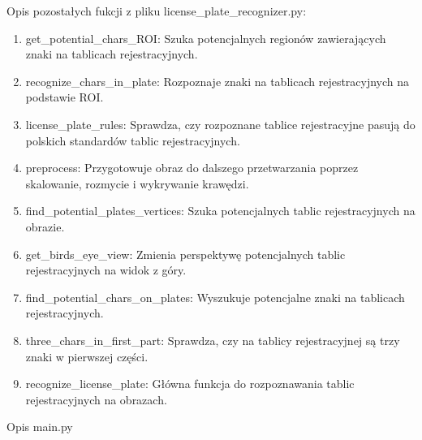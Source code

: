 \documentclass[12pt,a4paper,oneside]{article}
\theoremstyle{definition}
\numberwithin{equation}{section}
\begin{document}
Opis pozostałych fukcji z pliku license{\_}plate{\_}recognizer.py:
\begin{enumerate}
  \item get{\_}potential{\_}chars{\_}ROI: Szuka potencjalnych regionów zawierających znaki na tablicach rejestracyjnych.
  \item recognize{\_}chars{\_}in{\_}plate: Rozpoznaje znaki na tablicach rejestracyjnych na podstawie ROI.
  \item license{\_}plate{\_}rules: Sprawdza, czy rozpoznane tablice rejestracyjne pasują do polskich standardów tablic rejestracyjnych.
  \item preprocess: Przygotowuje obraz do dalszego przetwarzania poprzez skalowanie, rozmycie i wykrywanie krawędzi.
  \item find{\_}potential{\_}plates{\_}vertices: Szuka potencjalnych tablic rejestracyjnych na obrazie.
  \item get{\_}birds{\_}eye{\_}view: Zmienia perspektywę potencjalnych tablic rejestracyjnych na widok z góry.
  \item find{\_}potential{\_}chars{\_}on{\_}plates: Wyszukuje potencjalne znaki na tablicach rejestracyjnych.
  \item three{\_}chars{\_}in{\_}first{\_}part: Sprawdza, czy na tablicy rejestracyjnej są trzy znaki w pierwszej części.
  \item recognize{\_}license{\_}plate: Główna funkcja do rozpoznawania tablic rejestracyjnych na obrazach.
\end{enumerate}


Opis main.py
\end{document}

